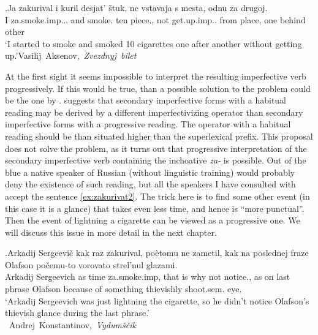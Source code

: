 \exg.\label{ex:zakurivat1}Ja zakurival i kuril desjat' \v{s}tuk, ne vstavaja s mesta, odnu za drugoj.\\
I za.smoke.imp... and smoke. ten piece., not get.up.imp.. from place, one behind other\\
\trans `I started to smoke and smoked 10 cigarettes one after another without getting up.'\hbox{}\hfill\hbox{Vasilij Aksenov, \textit{Zvezdnyj bilet}}

At the first sight it seems impossible to interpret the resulting imperfective verb progressively. If this would be true, than a possible solution to the problem could be the one by \citet{Ramchand:04}. \citet{Ramchand:04} suggests that secondary imperfective forms with a habitual reading may be derived by a different imperfectivizing operator than secondary imperfective forms with a progressive reading. The operator with a habitual reading should be than situated higher than the superlexical prefix. This proposal does not solve the problem, as it turns out that progressive interpretation of the secondary imperfective verb containing the inchoative \textit{za-} is possible. Out of the blue a native speaker of Russian (without linguistic training) would probably deny the existence of such reading, but all the speakers I have consulted with accept the sentence \ref{ex:zakurivat2}. The trick here is to find some other event (in this case it is a glance) that takes even less time, and hence is ``more punctual''. Then the event of lightning a cigarette can be viewed as a progressive one. We will discuss this issue in more detail in the next chapter.

\exg.\label{ex:zakurivat2}Arkadij Sergeevi\v{c} kak raz zakurival, po\`{e}tomu ne zametil, kak na poslednej fraze Olafson po\v{c}emu-to vorovato strel'nul glazami.\\
Arkadij Sergeevich as time za.smoke.imp, {that is why} not notice., as on last phrase Olafson {because of something} thievishly shoot.sem. eye.\\
\trans `Arkadij Sergeevich was just lightning the cigarette, so he didn't notice Olafson's thievish glance during the last phrase.'\\\hbox{}\hfill\hbox{
Andrej Konstantinov, \textit{Vydum\v{s}\v{c}ik}}

